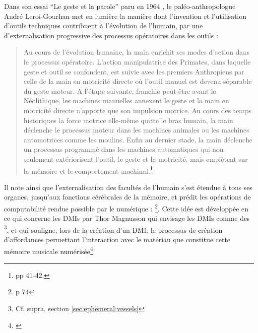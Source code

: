 \noindent Dans son essai ``Le geste et la parole'' paru en 1964 \cite{leroi-gourhan_geste_1964}, le paléo-anthropologue André Leroi-Gourhan met en lumière la manière dont l'invention et l'utilisation d'outils techniques contribuent à l'évolution de l'humain, par une d'externalisation progressive des processus opératoires dans les outils :
\vspace{-1em}
\begin{quotation}
	Au cours de l’évolution humaine, la main enrichit ses modes d’action dans le processus opératoire. L’action manipulatrice des Primates, dans laquelle geste et outil se confondent, est suivie avec les premiers Anthropiens par celle de la main en motricité directe où l’outil manuel est devenu séparable du geste moteur. A l’étape suivante, franchie peut-être avant le Néolithique, les machines manuelles annexent le geste et la main en motricité directe n’apporte que son impulsion motrice. Au cours des temps historiques la force motrice elle-même quitte le bras humain, la main déclenche le processus moteur dans les machines animales ou les machines automotrices comme les moulins. Enfin au dernier stade, la main déclenche un processus programmé dans les machines automatiques qui non seulement extériorisent l’outil, le geste et la motricité, mais empiètent sur la mémoire et le comportement machinal.\footnote{\cite{leroi-gourhan_geste_1964} pp 41-42.}
\end{quotation}
\indent Il note ainsi que l’externalisation des facultés de l'humain s’est étendue à tous ses organes, jusqu'aux fonctions cérébrales de la mémoire, et prédit les opérations de computabilité rendue possible par le numérique :
\footnote{\cite{leroi-gourhan_geste_1964} p 74}. Cette idée est développée en ce qui concerne les \glspl{DMI} par Thor Magnusson qui envisage les \glspl{DMI} comme des \footnote{Cf. supra, section \ref{sec:ephemeral:vessels}}, et qui souligne, lors de la création d'un \gls{DMI}, le processus de création d'affordances permettant l'interaction avec le matériau que constitue cette mémoire musicale numérisée\footnote{ \cite{magnusson_epistemic_2009}}.

